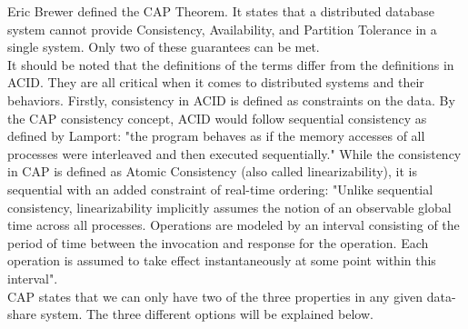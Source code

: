 \documentclass[a4paper,10pt,titlepage]{report}
\begin{document}
    Eric Brewer defined the CAP Theorem\cite{CAP}. It states that a distributed database system cannot provide Consistency, Availability, and Partition Tolerance in a single system. Only two of these guarantees can be met.\\
    \vspace{5mm}
    It should be noted that the definitions of the terms differ from the definitions in ACID. They are all critical when it comes to distributed systems and their behaviors. Firstly, consistency in ACID is defined as constraints on the data. By the CAP consistency concept, ACID would follow sequential consistency as defined by Lamport\cite{lamport1993how}: "the program behaves as if the memory accesses of all processes were interleaved and then executed sequentially." While the consistency in CAP is defined as Atomic Consistency (also called linearizability), it is sequential with an added constraint of real-time ordering: "Unlike sequential consistency, linearizability implicitly assumes the notion of an observable global time across all processes. Operations are modeled by an interval consisting of the period of time between the invocation and response for the operation. Each operation is assumed to take effect instantaneously at some point within this interval". \cite{CSL-TR-95-685} \\
    \vspace{5mm}
    CAP states that we can only have two of the three properties in any given data-share system. The three different options will be explained below.
\end{document}
